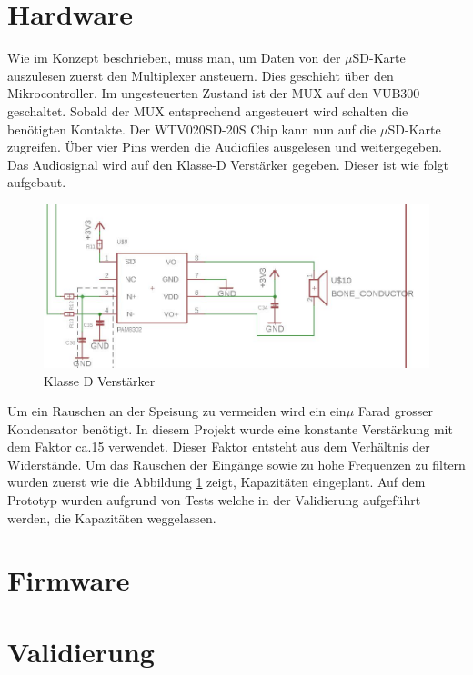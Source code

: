 \section{Hardware}
Wie im Konzept beschrieben, muss man, um Daten von der $\mu$SD-Karte auszulesen zuerst den Multiplexer ansteuern. Dies geschieht über den Mikrocontroller. Im ungesteuerten Zustand ist der MUX auf den VUB300 geschaltet. Sobald der MUX entsprechend angesteuert wird schalten die benötigten Kontakte. Der WTV020SD-20S Chip kann nun auf die $\mu$SD-Karte zugreifen. Über vier Pins werden die Audiofiles ausgelesen und weitergegeben. Das Audiosignal wird auf den Klasse-D Verstärker gegeben. Dieser ist wie folgt aufgebaut.
\begin{figure}[h]
	\centering
	\includegraphics[width=15cm]{Bilder/Klasse-D.jpg}
	\caption{Klasse D Verstärker}
	\label{Klasse-D}
\end{figure}
Um ein Rauschen an der Speisung zu vermeiden wird ein ein$\mu$ Farad grosser Kondensator benötigt. In diesem Projekt wurde eine konstante Verstärkung mit dem Faktor ca.15 verwendet. Dieser Faktor entsteht aus dem Verhältnis der Widerstände. Um das Rauschen der Eingänge sowie zu hohe Frequenzen zu filtern wurden zuerst wie die Abbildung \ref{Klasse-D} zeigt, Kapazitäten eingeplant. Auf dem Prototyp wurden aufgrund von Tests welche in der Validierung aufgeführt werden, die Kapazitäten weggelassen.


\section{Firmware}
\section{Validierung}